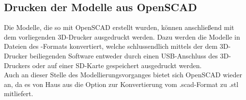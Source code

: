 \subsection{Drucken der Modelle aus OpenSCAD}
Die Modelle, die so mit OpenSCAD erstellt wurden, können anschließend mit dem vorliegenden 3D-Drucker  ausgedruckt werden.
Dazu werden die Modelle in Dateien des -Formats konvertiert, welche schlussendlich mittels der dem 3D-Drucker beiliegenden Software entweder durch einen USB-Anschluss des 3D-Druckers oder auf einer SD-Karte gespeichert ausgedruckt werden. \\
Auch an dieser Stelle des Modellierungsvorganges bietet sich OpenSCAD wieder an, da es von Haus aus die Option zur Konvertierung vom .scad-Format zu .stl mitliefert.
